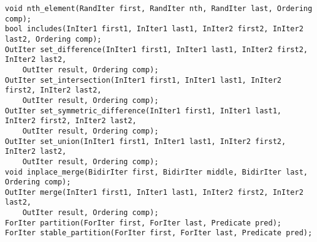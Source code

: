 \begin{lstlisting}
void nth_element(RandIter first, RandIter nth, RandIter last, Ordering comp);
bool includes(InIter1 first1, InIter1 last1, InIter2 first2, InIter2 last2, Ordering comp);
OutIter set_difference(InIter1 first1, InIter1 last1, InIter2 first2, InIter2 last2,
    OutIter result, Ordering comp);
OutIter set_intersection(InIter1 first1, InIter1 last1, InIter2 first2, InIter2 last2,
    OutIter result, Ordering comp);
OutIter set_symmetric_difference(InIter1 first1, InIter1 last1, InIter2 first2, InIter2 last2,
    OutIter result, Ordering comp);
OutIter set_union(InIter1 first1, InIter1 last1, InIter2 first2, InIter2 last2,
    OutIter result, Ordering comp);
void inplace_merge(BidirIter first, BidirIter middle, BidirIter last, Ordering comp);
OutIter merge(InIter1 first1, InIter1 last1, InIter2 first2, InIter2 last2,
    OutIter result, Ordering comp);
ForIter partition(ForIter first, ForIter last, Predicate pred);
ForIter stable_partition(ForIter first, ForIter last, Predicate pred);
\end{lstlisting}

\newpage

